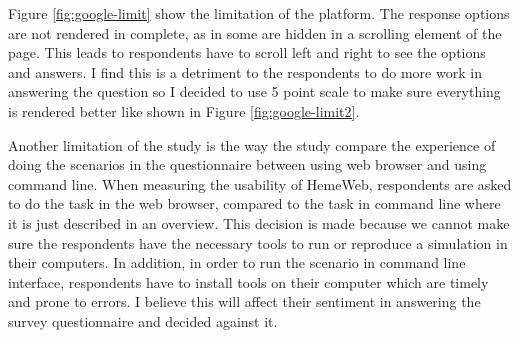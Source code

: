 \vspace{0.5cm}
\noindent%
\begin{minipage}{\linewidth}%
 \label{fig:google-limit2}%
\end{minipage}

\vspace{0.5cm}


Figure \ref{fig:google-limit} show the limitation of the platform. The response options are not rendered in complete, as in some are hidden in a scrolling element of the page. This leads to respondents have to scroll left and right to see the options and answers. I find this is a detriment to the respondents to do more work in answering the question so I decided to use 5 point scale to make sure everything is rendered better like shown in Figure \ref{fig:google-limit2}.


Another limitation of the study is the way the study compare the experience of doing the scenarios in the questionnaire between using web browser and using command line.  When measuring the usability of HemeWeb, respondents are asked to do the task in the web browser, compared to the task in command line where it is just described in an overview. This decision is made because we cannot make sure the respondents have the necessary tools to run or reproduce a simulation in their computers.  In addition, in order to run the scenario in command line interface, respondents have to install tools on their computer which are timely and prone to errors. I believe this will affect their sentiment in answering the survey questionnaire and decided against it.


